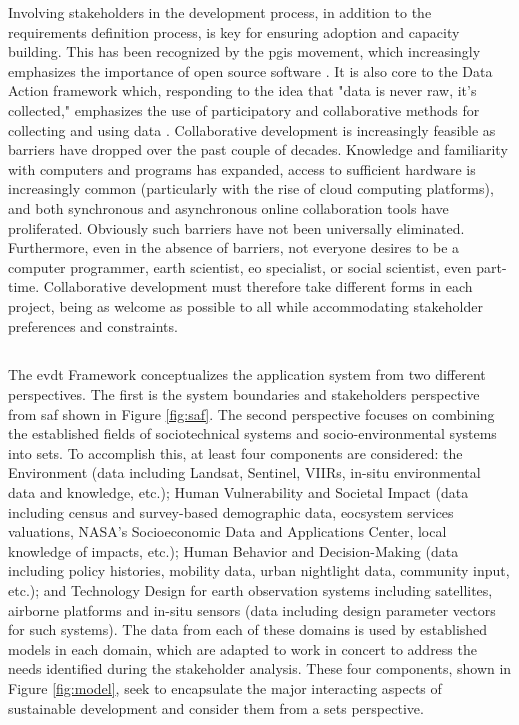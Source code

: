 Involving stakeholders in the development process, in addition to the requirements definition process, is key for ensuring adoption and capacity building. This has been recognized by the \ac{pgis} movement, which increasingly emphasizes the importance of open source software \cite{williamsonTheirworkDevelopmentSustainable2011, dodgeMappingModesMethods2011}. It is also core to the Data Action framework which, responding to the idea that "data is never raw, it's collected," emphasizes the use of participatory and collaborative methods for collecting and using data \cite{williamsDataActionUsing2020}. Collaborative development is increasingly feasible as barriers have dropped over the past couple of decades. Knowledge and familiarity with computers and programs has expanded, access to sufficient hardware is increasingly common (particularly with the rise of cloud computing platforms), and both synchronous and asynchronous online collaboration tools have proliferated. Obviously such barriers have not been universally eliminated. Furthermore, even in the absence of barriers, not everyone desires to be a computer programmer, earth scientist, \ac{eo} specialist, or social scientist, even part-time. Collaborative development must therefore take different forms in each project, being as welcome as possible to all while accommodating stakeholder preferences and constraints.

\subsection{} 

The \ac{evdt} Framework conceptualizes the application system from two different perspectives. The first is the system boundaries and stakeholders perspective from \ac{saf} shown in Figure \ref{fig:saf}. The second perspective focuses on combining the established fields of sociotechnical systems \cite{rouseUnderstandingChangeComplex2012,siddiqiSociotechnicalSystemsSustainability2017,sussmanTeachingComplexSociotechnical2010} and socio-environmental systems \cite{elsawahEightGrandChallenges2020} into \ac{sets}. To accomplish this, at least four components are considered: the Environment (data including Landsat, Sentinel, VIIRs, in-situ environmental data and knowledge, etc.); Human Vulnerability and Societal Impact (data including census and survey-based demographic data, eocsystem services valuations, NASA's Socioeconomic Data and Applications Center, local knowledge of impacts, etc.); Human Behavior and Decision-Making (data including policy histories, mobility data, urban nightlight data, community input, etc.); and Technology Design for earth observation systems including satellites, airborne platforms and in-situ sensors (data including design parameter vectors for such systems). The data from each of these domains is used by established models in each domain, which are adapted to work in concert to address the needs identified during the stakeholder analysis. These four components, shown in Figure \ref{fig:model}, seek to encapsulate the major interacting aspects of sustainable development and consider them from a \ac{sets} perspective. 

